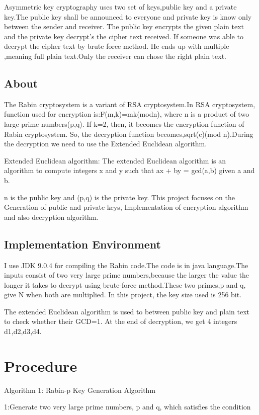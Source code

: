 \documentclass[12pt,a4paper]{article}
\begin{document}
 Asymmetric key cryptography uses two set of keys,public key and a
 private key.The public key shall be announced to everyone and
 private key is know only between the sender and receiver. The
 public key encrypts the given plain text and the private key
 decrypt's the cipher text received. If someone was able to decrypt
 the cipher text by brute force method. He ends up with multiple
 ,meaning full plain text.Only the receiver can chose the right
 plain text.

\subsection{About}
The Rabin cryptosystem is a variant of RSA cryptosystem.In RSA
cryptosystem, function used for encryption is:F(m,k)=mk(modn), where
n is a product of two large prime numbers(p,q). If k=2, then, it
becomes the encryption function of Rabin cryptosystem.
So, the decryption function becomes,sqrt(c)(mod n).During the
decryption we need to use the Extended Euclidean algorithm.

Extended Euclidean algorithm:
The extended Euclidean algorithm is an algorithm to compute integers x and y such that
ax + by = gcd(a,b)
given a and b.

n is the public key and (p,q) is the private key.
This project focuses on the Generation of public and private keys,
Implementation of encryption algorithm and also decryption algorithm.
 
\subsection{Implementation Environment}
I use JDK 9.0.4 for compiling the Rabin code.The code is in java
language.The inputs consist of two very large prime numbers,because the
larger the value the longer it takes to decrypt using brute-force
method.These two primes,p and q, give N when both are multiplied.
In this project, the key size used is 256 bit.

The extended Euclidean algorithm is used to between public key and plain text to check whether their GCD=1.
At the end of decryption, we get 4 integers d1,d2,d3,d4.
\section{Procedure}
Algorithm 1: Rabin-p Key Generation Algorithm

1:Generate two very large prime numbers, p and q, which satisfies the
  condition
  
\end{document}
